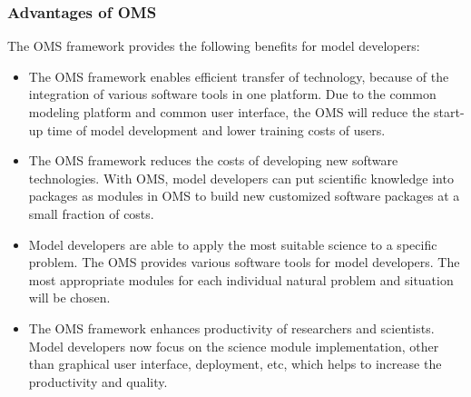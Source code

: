 \subsubsection{Advantages of OMS}
\par
The OMS framework provides the following benefits for model developers: \autocite{dsl:oms-ahuja}
\begin{itemize}
\item The OMS framework enables efficient transfer of technology, because of the  integration of various software tools in one platform. Due to the common modeling platform and common user interface, the OMS will reduce the start-up time of model development and lower training costs of users.

\item The OMS framework reduces the costs of developing new software technologies. With OMS, model developers can put scientific knowledge into packages as modules in OMS to build new customized software packages at a small fraction of costs.

\item Model developers are able to apply the most suitable science to a specific problem. The OMS provides various software tools for model developers. The most appropriate modules for each individual natural problem and situation will be chosen.

\item The OMS framework enhances productivity of researchers and scientists. Model developers now focus on the science module implementation, other than graphical user interface, deployment, etc, which helps to increase the productivity and quality.

\end{itemize}
